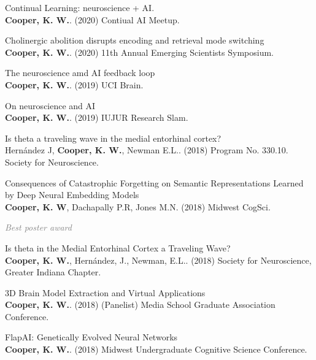 \documentclass[10pt]{cooperCV2}
\begin{document}
\begin{etaremune}[itemindent=-1.5\bibhang, topsep=0pt,
				   itemsep=\bibsep,partopsep=0pt,parsep=0pt,leftmargin={\bibhang+\widthof{[999]}}]
	
    \item Continual Learning: neuroscience + AI.\\ \textbf{Cooper, K. W.}. (2020) Contiual AI Meetup. 
     
	
    \item Cholinergic abolition disrupts encoding and retrieval mode switching\\ \textbf{Cooper, K. W.}. (2020) 11th Annual Emerging Scientists Symposium. 
     
	
    \item The neuroscience amd AI feedback loop\\ \textbf{Cooper, K. W.}. (2019) UCI Brain. 
     
	
    \item On neuroscience and AI\\ \textbf{Cooper, K. W.}. (2019) IUJUR Research Slam. 
     
	
    \item Is theta a traveling wave in the medial entorhinal cortex?\\ Hernández J, \textbf{Cooper, K. W.}, Newman E.L.. (2018) Program No. 330.10. Society for Neuroscience. 
     
	
    \item Consequences of Catastrophic Forgetting on Semantic Representations Learned by Deep Neural Embedding Models\\ \textbf{Cooper, K. W}, Dachapally P.R, Jones M.N. (2018) Midwest CogSci. 
     
     	\begin{innerlist}
     	
	     \item  \textcolor{grey}{\textit{Best poster award} }
     	
     	\end{innerlist}
     
	
    \item Is theta in the Medial Entorhinal Cortex a Traveling Wave?\\ \textbf{Cooper, K. W.}, Hernández, J., Newman, E.L.. (2018) Society for Neuroscience, Greater Indiana Chapter. 
     
	
    \item 3D Brain Model Extraction and Virtual Applications\\ \textbf{Cooper, K. W.}. (2018) (Panelist) Media School Graduate Association Conference. 
     
	
    \item FlapAI: Genetically Evolved Neural Networks\\ \textbf{Cooper, K. W.}. (2018) Midwest Undergraduate Cognitive Science Conference. 
     

\end{etaremune}
\end{document}

